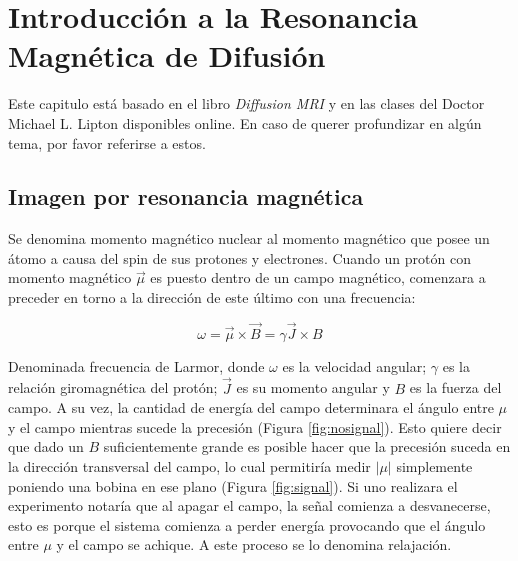 \chapter{Introducci\'on a la Resonancia Magn\'etica de Difusi\'on}

Este capitulo est\'a basado en el libro \textit{Diffusion MRI} \cite{Basser2009}
y en las clases del Doctor Michael L. Lipton \cite{Lipton2014} disponibles online. 
En caso de querer profundizar en alg\'un tema, por favor referirse a estos. 

\section{Imagen por resonancia magnética}
Se denomina momento magn\'etico nuclear al momento magn\'etico que posee un 
\'atomo a causa del spin de sus protones y electrones. Cuando un prot\'on con 
momento magn\'etico $\vec{\mu}$ es puesto dentro de un campo magn\'etico, 
comenzara a preceder en torno a la direcci\'on de este \'ultimo con una 
frecuencia: 

$$ \omega = \vec{\mu} \times \vec{B} = \gamma \vec{J} \times B $$

Denominada frecuencia de Larmor, donde $\omega$ es la velocidad angular; $\gamma$ es
la relaci\'on giromagn\'etica del prot\'on; $\vec{J}$ es su momento angular y $B$
es la fuerza del campo. A su vez, la cantidad de energ\'ia del campo determinara
el \'angulo entre $\mu$ y el campo mientras sucede la precesi\'on
(Figura \ref{fig:nosignal}). Esto quiere decir que dado un $B$ suficientemente 
grande es posible hacer que la precesi\'on suceda en la direcci\'on transversal
del campo, lo cual permitir\'ia medir $|\mu|$ simplemente poniendo una bobina en
ese plano (Figura \ref{fig:signal}). Si uno realizara el experimento notar\'ia
que al apagar el campo, la se\~nal comienza a desvanecerse, esto es porque el
sistema comienza a perder energ\'ia provocando que el \'angulo entre $\mu$ y el
campo se achique. A este proceso se lo denomina relajaci\'on. \\

